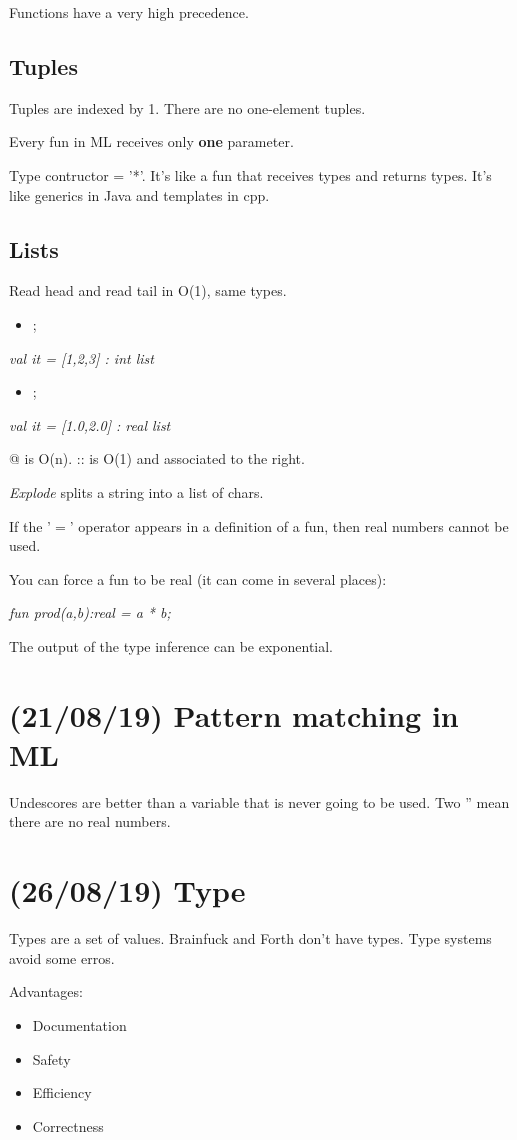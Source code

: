 \documentclass[11pt]{article}
\begin{document}
Functions have a very high precedence.

\subsection{Tuples}
\label{sec:org2dced73}
Tuples are indexed by 1. There are no one-element tuples.

Every fun in ML receives only \textbf{one} parameter.

Type contructor = '*'. It's like a fun that receives types and returns types. It's like
generics in Java and templates in cpp.

\subsection{Lists}
\label{sec:org503f1a9}
Read head and read tail in O(1), same types.
\begin{itemize}
\item\relax [1,2,3];
\end{itemize}
\emph{val it = [1,2,3] : int list}
\begin{itemize}
\item\relax [1.0,2.0];
\end{itemize}
\emph{val it = [1.0,2.0] : real list}

@ is O(n). :: is O(1) and associated to the right.

\emph{Explode} splits a string into a list of chars.

If the '\(=\)' operator appears in a definition of a fun, then real numbers cannot be used.

You can force a fun to be real (it can come in several places):

\emph{fun prod(a,b):real = a * b;}

The output of the type inference can be exponential.
\section{(21/08/19) Pattern matching in ML}
\label{sec:orgbefdbe0}
Undescores are better than a variable that is never going to be used.
Two '' mean there are no real numbers.
\section{(26/08/19) Type}
\label{sec:org824b992}
Types are a set of values. Brainfuck and Forth don't have types. Type systems avoid some
erros.

Advantages: 
\begin{itemize}
\item Documentation
\item Safety
\item Efficiency
\item Correctness
\end{itemize}
\end{document}
